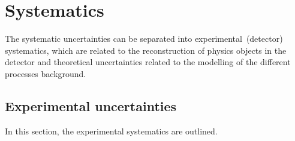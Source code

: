 \section{Systematics}
\label{sec:systematics}

The systematic uncertainties can be separated into experimental~(detector) systematics, which are related to the reconstruction of physics objects in the detector and theoretical uncertainties related to the modelling of the different processes background.

\subsection{Experimental uncertainties}
\label{subsec:syst_exp}

In this section, the experimental systematics are outlined.

